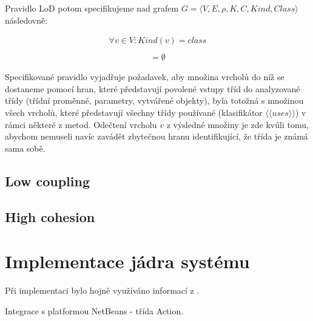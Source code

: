 Pravidlo LoD potom specifikujeme nad grafem $G = \langle V, E, \rho, K, C, \mathit{Kind}, \mathit{Class}\rangle$ následovně:

\begin{align*}
\forall v \in V: Kind(v) = class\\
\end{align*}
\begin{align*}
[((&F(G, v, class, \langle\langle{}has\_field\rangle\rangle{}) \cup F(G, v, class, \langle\langle{}has\_param\rangle\rangle{}) \cup\\
&F(G, v, class, \langle\langle{}instantiates\rangle\rangle{})) \cap F(v, class, \langle\langle{}uses\rangle\rangle{}) \setminus \{v\}] = \emptyset
\end{align*}

Specifikované pravidlo vyjadřuje požadavek, aby množina vrcholů do níž se dostaneme pomocí hran, které představují povolené vstupy tříd do analyzované třídy (třídní proměnné, parametry, vytvářené objekty), byla totožná s množinou všech vrcholů, které představují všechny třídy používané (klasifikátor $\langle\langle{}uses\rangle\rangle$) v rámci některé z metod. Odečtení vrcholu $v$ z výsledné množiny je zde kvůli tomu, abychom nemuseli navíc zavádět zbytečnou hranu identifikující, že třída je známá sama sobě.

\subsection{Low coupling}

\subsection{High cohesion}

\section{Implementace jádra systému}

Při implementaci bylo hojně využíváno informací z \cite{netbeans_platform}.

Integrace s platformou NetBeans - třída Action.

